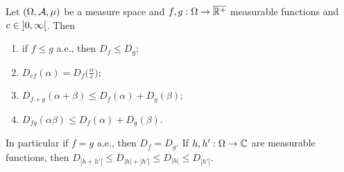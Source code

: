\begin{lemma} \label{distributionOfFunctionLemma}
Let $\sSet{\Omega, \mathcal{A}, \mu}$ be a measure space and $f,g: \Omega\to \overline{\mathbb{R}^+}$ measurable functions and $c\in \interval[o]{0,\infty}$. Then
\begin{enumerate}
\item if $f \leq g$ a.e., then $D_f \leq D_g$;
\item $D_{cf}(\alpha) = D_f\Big(\frac{\alpha}{c}\Big)$;
\item $D_{f+g}(\alpha+\beta) \leq D_f(\alpha) + D_g(\beta)$;
\item $D_{fg}(\alpha\beta) \leq D_f(\alpha) + D_g(\beta)$.
\end{enumerate}
\end{lemma}
In particular if $f = g$ a.e., then $D_f = D_g$. If $h,h': \Omega\to \mathbb{C}$ are measurable functions, then $D_{|h+h'|}\leq D_{|h|+|h'|} \leq D_{|h|} \leq D_{|h'|}$.
